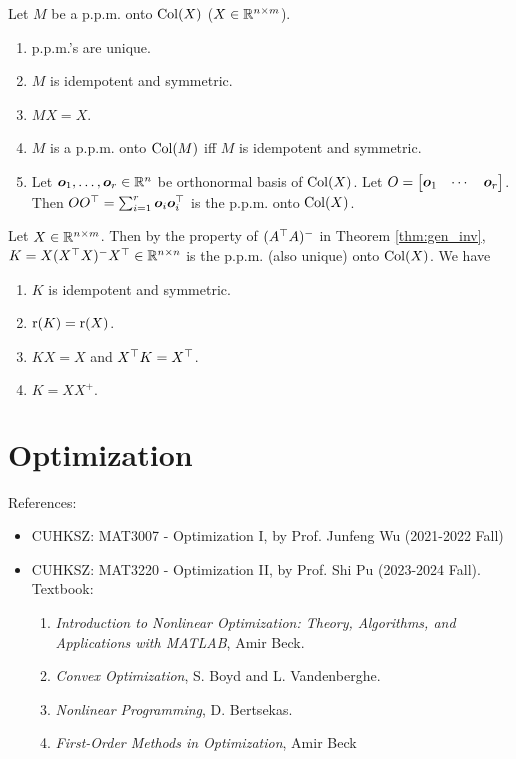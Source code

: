 \documentclass[10pt,a4paper]{book}
\begin{document}
\begin{thmbox}
	\begin{theorem}[Properties of p.p.m.]\label{thm:prop_ppm}
		Let $M$ be a p.p.m. onto $\mathrm{Col}(X)$ ($X\in\mathbb R^{n\times m}$). 
		\begin{enumerate}
			\item p.p.m.'s are unique.
			\item $M$ is idempotent and symmetric.
			\item $MX=X$. 
			\item $M$ is a p.p.m. onto $\mathrm{Col}(M)$ iff $M$ is idempotent and symmetric.
			\item Let ${\boldsymbol o}_1,\ldots,{\boldsymbol o}_r\in\mathbb R^{n}$ be orthonormal basis of $\mathrm{Col}(X)$. Let $O=\begin{bmatrix}
				{\boldsymbol o}_1 & \cdots & {\boldsymbol o}_r
			\end{bmatrix}$. Then $O O^\top=\sum_{i=1}^{r}{\boldsymbol o}_i{\boldsymbol o}_i^\top$ is the p.p.m. onto $\mathrm{Col}(X)$.        
		\end{enumerate}
	\end{theorem}
\end{thmbox}

\begin{exbox}
	\begin{example}[Regression]\label{ex:ppm_reg}
		Let $X\in\mathbb R^{n\times m}$. Then by the property of $(A^\top A)^{-}$ in Theorem \ref{thm:gen_inv}, $K=X(X^\top X)^{-}X^\top\in\mathbb R^{n\times n}$ is the p.p.m. (also unique) onto $\mathrm{Col}(X)$. 
		We have
		\begin{enumerate}
			\item $K$ is idempotent and symmetric.
			\item $\mathrm{r}(K)=\mathrm{r}(X)$.
			\item $KX=X$ and $X^\top K=X^\top$.  
			\item $K= XX^{+}.$ 
		\end{enumerate}
	\end{example}
\end{exbox}


\chapter{Optimization}\label{chap:opt}

References: 
\begin{itemize}
	\item CUHKSZ: MAT3007 - Optimization I, by Prof. Junfeng Wu (2021-2022 Fall)
	\item CUHKSZ: MAT3220 - Optimization II, by Prof. Shi Pu (2023-2024 Fall). Textbook: 
	\begin{enumerate}
		\item \textit{Introduction to Nonlinear Optimization: Theory, Algorithms, and
		Applications with MATLAB}, Amir Beck.
		\item \textit{Convex Optimization}, S. Boyd and L. Vandenberghe.
		\item \textit{Nonlinear Programming}, D. Bertsekas.
		\item \textit{First-Order Methods in Optimization}, Amir Beck
	\end{enumerate}
\end{itemize}
\end{document}
